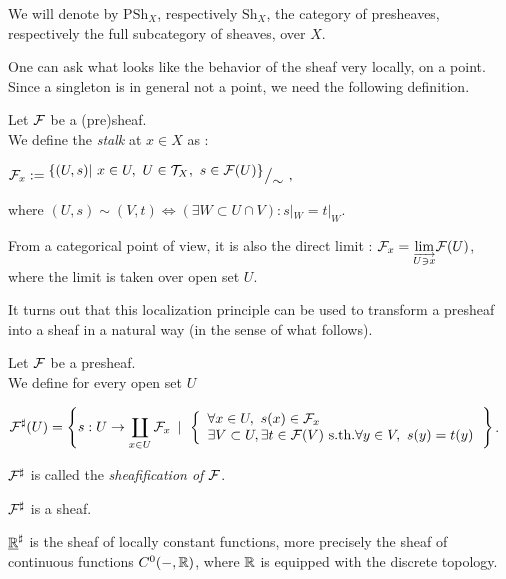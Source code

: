 \begin{mydef}
We will denote by $\text{PSh}_X$, respectively $\text{Sh}_X$, the category of presheaves, respectively the full subcategory of sheaves, over $X$.
\end{mydef}

One can ask what looks like the behavior of the sheaf very locally, on a point. Since a singleton is in general not a point, we need the following definition.

\begin{mydef}
Let $\mathcal{F}$ be a (pre)sheaf.\\
We define the \textit{stalk} at $x\in X$ as :
\begin{center}
$\mathcal{F}_x := {^{\textstyle \{(U,s) | ~x\in U, ~U \in \mathcal{T}_X, ~s \in \mathcal{F}(U)\}}\big/_{\textstyle \sim}}~,$
\end{center}
where $(U,s) \sim (V,t) \Leftrightarrow (\exists W \subset U \cap V): s|_W = t|_W$.
\end{mydef}

\begin{myrem}
From a categorical point of view, it is also the direct limit : $\mathcal{F}_x = \underset{\overrightarrow{U \ni x}}{\lim} \mathcal{F}(U)$, where the limit is taken over open set $U$.
\end{myrem}

It turns out that this localization principle can be used to transform a presheaf into a sheaf in a natural way (in the sense of what follows).

\begin{mydef}
Let $\mathcal{F}$ be a presheaf.\\
We define for every open set $U$
\begin{center}
$\displaystyle \mathcal{F}^{\sharp}(U) = \left\lbrace s : U \to \coprod_{x\in U} \mathcal{F}_x ~\left|\right.~ \left\lbrace 
\begin{array}{l}
\forall x\in U,~ s(x) \in \mathcal{F}_x\\
\exists V \subset U,\exists t\in \mathcal{F}(V) \text{ s.th.} \forall y\in V,~ s(y) = t(y)
\end{array}
\right. \right\rbrace$.
\end{center}
$\mathcal{F}^\sharp$ is called the \textit{sheafification of $\mathcal{F}$}.
\end{mydef}

\begin{myprop}
$\mathcal{F}^\sharp$ is a sheaf.
\end{myprop}

\begin{myex}
$\underline{\mathbb{R}}^\sharp$ is the sheaf of locally constant functions, more precisely the sheaf of continuous functions $C^0(\--,\mathbb{R})$, where $\mathbb{R}$ is equipped with the discrete topology.
\end{myex}



